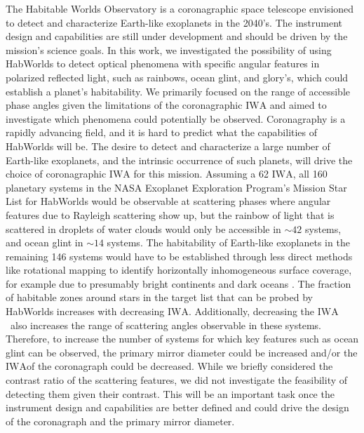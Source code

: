 \documentclass[
    usenatbib,
]{mnras}
\newcommand{\IWA}{\ensuremath{\mathrm{IWA}}}
\newcommand{\hwo}{HabWorlds}
\begin{document}

The Habitable Worlds Observatory is a coronagraphic space telescope 
envisioned to detect and characterize Earth-like exoplanets in the 2040's. 
%
The instrument design and capabilities are still under development and 
should be driven by the mission's science goals.
%
In this work, we investigated the possibility of using \hwo{} to detect optical phenomena with specific angular features in polarized reflected light, such as rainbows, ocean glint, and glory's, which could establish a planet's habitability. 
%
We primarily focused on the range of accessible phase angles given the limitations of the coronagraphic \IWA{} and aimed to investigate which phenomena could potentially be observed.
%
Coronagraphy is a rapidly advancing field, and it is hard to predict what the capabilities of \hwo{} will be.
%
The desire to detect and characterize a large number of Earth-like exoplanets, and the intrinsic occurrence of such planets, will drive the choice of coronagraphic \IWA{} for this mission.
%
Assuming a \qty{62}{\mas} \IWA{}, all \num{160} planetary systems in the NASA Exoplanet Exploration Program's Mission Star List for \hwo{} would be observable at scattering phases where angular features due to Rayleigh scattering show up, but the rainbow of light that is scattered in droplets of water clouds would only be accessible in $\sim\num{42}$ systems, and ocean glint in $\sim\num{14}$ systems.
%
The habitability of Earth-like exoplanets in the remaining 146 systems would have to be established through less direct methods like rotational mapping to identify horizontally inhomogeneous surface coverage, for example due to presumably bright continents and dark oceans \citep[e.g.,][]{2009ApJ...700..915C,lustig2019}.   
%
The fraction of habitable zones around stars in the target list that can be probed by \hwo{} increases with decreasing \IWA{}. 
%
Additionally, decreasing the \IWA\ also increases the range of scattering angles observable in these systems. 
%
Therefore, to increase the number of systems for which key features such as ocean glint can be observed, the primary mirror diameter could be increased and/or the \IWA of the coronagraph could be decreased.
%
While we briefly considered the contrast ratio of the scattering features, we did not investigate the feasibility of detecting them given their contrast. 
%
This will be an important task once the instrument design and capabilities are better defined and could drive the design of the coronagraph and the primary mirror diameter. 
\end{document}
